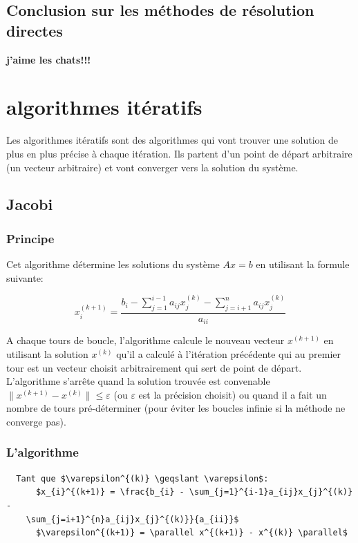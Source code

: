 \documentclass[a4paper]{article}
\begin{document}
\subsection{Conclusion sur les méthodes de résolution directes}

\textbf{j'aime les chats!!!}

\section{algorithmes itératifs}

Les algorithmes itératifs sont des algorithmes qui vont trouver une solution de
plus en plus précise à chaque itération. Ils partent d'un point de départ
arbitraire (un vecteur arbitraire) et vont converger vers la solution du
système.

\subsection{Jacobi}

\subsubsection{Principe}

Cet algorithme détermine les solutions du système $Ax = b$ en utilisant la
formule suivante:

\[x_{i}^{(k+1)} = \frac{b_{i} - \sum_{j=1}^{i-1}a_{ij}x_{j}^{(k)} -
  \sum_{j=i+1}^{n}a_{ij}x_{j}^{(k)}}{a_{ii}}\]

A chaque tours de boucle, l'algorithme calcule le nouveau vecteur $x^{(k+1)}$ en
utilisant la solution $x^{(k)}$ qu'il a calculé à l'itération précédente qui au
premier tour est un vecteur choisit arbitrairement qui sert de point de
départ. L'algorithme s'arrête quand la solution trouvée est convenable
$\parallel x^{(k+1)} - x^{(k)} \parallel \leqslant \varepsilon$ (ou
$\varepsilon$ est la précision choisit) ou quand il a fait un nombre de tours
pré-déterminer (pour éviter les boucles infinie si la méthode ne converge pas).

\subsubsection{L'algorithme}

\begin{lstlisting}
  Tant que $\varepsilon^{(k)} \geqslant \varepsilon$:
      $x_{i}^{(k+1)} = \frac{b_{i} - \sum_{j=1}^{i-1}a_{ij}x_{j}^{(k)} -
    \sum_{j=i+1}^{n}a_{ij}x_{j}^{(k)}}{a_{ii}}$
      $\varepsilon^{(k+1)} = \parallel x^{(k+1)} - x^{(k)} \parallel$
\end{lstlisting}
\end{document}
